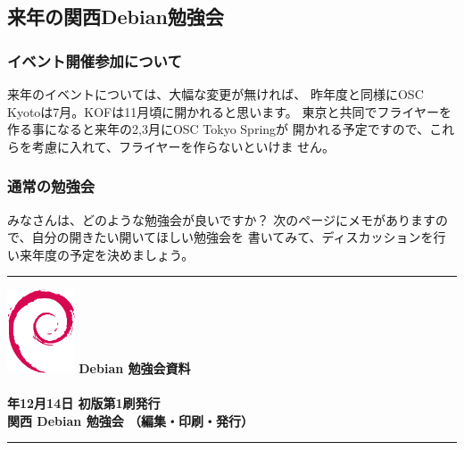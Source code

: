 \documentclass[mingoth,a4paper]{jsarticle}
\newcommand{\debmtgyear}{2008}
\newcommand{\debmtgdate}{14}
\newcommand{\debmtgmonth}{12}
\begin{document}
\newpage

\subsection{来年の関西Debian勉強会}

\subsubsection{イベント開催参加について}

来年のイベントについては、大幅な変更が無ければ、
昨年度と同様にOSC Kyotoは7月。KOFは11月頃に開かれると思います。
東京と共同でフライヤーを作る事になると来年の2,3月にOSC Tokyo Springが
開かれる予定ですので、これらを考慮に入れて、フライヤーを作らないといけま
せん。

\subsubsection{通常の勉強会}

みなさんは、どのような勉強会が良いですか？
次のページにメモがありますので、自分の開きたい開いてほしい勉強会を
書いてみて、ディスカッションを行い来年度の予定を決めましょう。

\newpage

\mbox{}\newpage

\mbox{}\newpage

\printindex
 \cleartooddpage

 \begin{minipage}[b]{0.2\hsize}
 \end{minipage}
 \begin{minipage}[b]{0.8\hsize}

 \vspace*{15cm}
 \rule{\hsize}{1mm}
 \vspace{2mm}
 \includegraphics[width=2cm]{image200502/openlogo-nd.eps}
 \noindent \Large \bf Debian 勉強会資料\\ \\
 \noindent \normalfont \debmtgyear{}年\debmtgmonth{}月\debmtgdate{}日 \hspace{5mm}  初版第1刷発行\\
 \noindent \normalfont 関西 Debian 勉強会 （編集・印刷・発行）\\
 \rule{\hsize}{1mm}
 \end{minipage}
\end{document}
